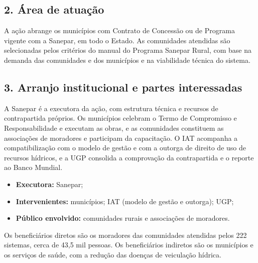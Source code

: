 \subsection*{2. Área de atuação}

A ação abrange os municípios com Contrato de Concessão ou de Programa vigente com a Sanepar, em todo o Estado. As comunidades atendidas são selecionadas pelos critérios do manual do Programa Sanepar Rural, com base na demanda das comunidades e dos municípios e na viabilidade técnica do sistema.


{}
\subsection*{3. Arranjo institucional e partes interessadas}

A Sanepar é a executora da ação, com estrutura técnica e recursos de contrapartida próprios. Os municípios celebram o Termo de Compromisso e Responsabilidade e executam as obras, e as comunidades constituem as associações de moradores e participam da capacitação. O IAT acompanha a compatibilização com o modelo de gestão e com a outorga de direito de uso de recursos hídricos, e a UGP consolida a comprovação da contrapartida e o reporte ao Banco Mundial.


\begin{itemize}
  \item \textbf{Executora:} Sanepar;
  \item \textbf{Intervenientes:} municípios; IAT (modelo de gestão e outorga); UGP;
  \item \textbf{Público envolvido:} comunidades rurais e associações de moradores.
\end{itemize}

Os beneficiários diretos são os moradores das comunidades atendidas pelos 222 sistemas, cerca de 43,5 mil pessoas. Os beneficiários indiretos são os municípios e os serviços de saúde, com a redução das doenças de veiculação hídrica.

